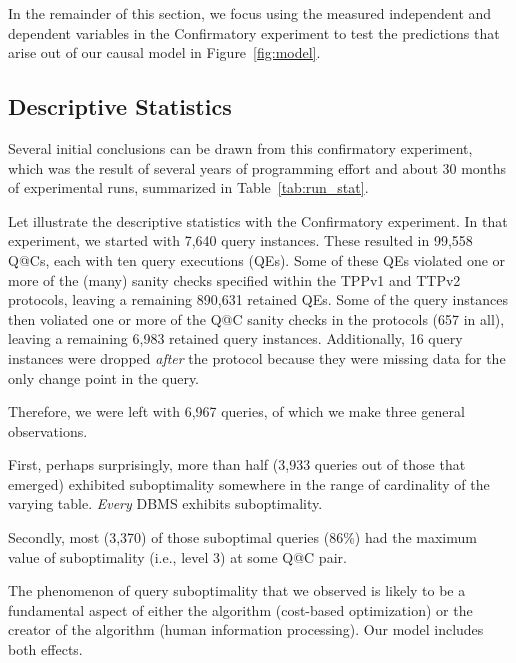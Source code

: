 \documentclass[prodmode,acmtods]{acmsmall}
\begin{document}
In the remainder of this section, we focus using the measured independent
and dependent variables in the Confirmatory experiment
to test the predictions that arise out of our causal model in Figure~\ref{fig:model}.

\subsection{Descriptive Statistics}
Several initial conclusions can be drawn from this confirmatory experiment, which was the
result of several years of programming effort and about 30 months of
experimental runs, summarized in Table~\ref{tab:run_stat}. 

Let illustrate the descriptive statistics with the Confirmatory
experiment. In that experiment, we started with 7,640 query instances. These
resulted in 99,558 Q@Cs, each with ten query executions (QEs). Some of these
QEs violated one or more of the (many) sanity checks specified within the
TPPv1 and TTPv2 protocols, leaving a remaining 890,631
retained QEs. Some of the query instances then voliated one or more of the
Q@C sanity checks in the protocols (657 in all), leaving a remaining 6,983 retained query
instances. Additionally, 16 query instances were dropped {\em after} the
protocol because they were missing data for the only change point in the
query.

Therefore, we were left with 6,967 queries, of which we make three general observations.

First, perhaps surprisingly, 
more than half (3,933 queries out of those that emerged) exhibited suboptimality
somewhere in the range of cardinality of the varying table. 
{\em Every} \hbox{DBMS} exhibits suboptimality.

Secondly, most (3,370) of those suboptimal queries (86\%) had the maximum value of
suboptimality  (i.e., level 3) at some Q@C pair.

The phenomenon of query suboptimality that we observed is likely to be a
fundamental aspect of either the algorithm (cost-based optimization) or the
creator of the algorithm (human information processing). Our model includes
both effects.
\end{document}
